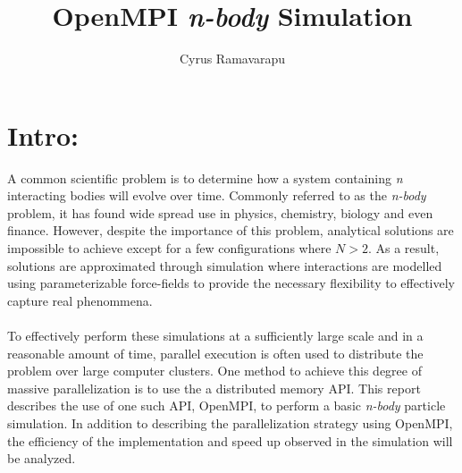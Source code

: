 \documentclass{article}
\begin{document}
\title{OpenMPI \textit{n-body} Simulation}
\author{Cyrus Ramavarapu}
\renewcommand{\today}{12 November 2016}
\maketitle

\section*{Intro:}
A common scientific problem is to determine how a system
containing \textit{n} interacting bodies will evolve over
time.  Commonly referred to as the \textit{n-body} problem,
it has found wide spread use in physics, chemistry, biology
and even finance.  However, despite the importance of this
problem, analytical solutions are impossible to achieve
except for a few configurations where $N > 2$.  As a result,
solutions are approximated through simulation where 
interactions are modelled using parameterizable force-fields
to provide the necessary flexibility to effectively capture
real phenommena.\\\\
To effectively perform these simulations at a sufficiently
large scale and in a reasonable amount of time, parallel
execution is often used to distribute the problem over
large computer clusters.  One method to achieve this degree
of massive parallelization is to use the a distributed
memory API.  This report describes the use of one such API,
OpenMPI, to perform a basic \textit{n-body} particle simulation.
In addition to describing the parallelization strategy using
OpenMPI, the efficiency of the implementation and speed up 
observed in the simulation will be analyzed.
\end{document}
